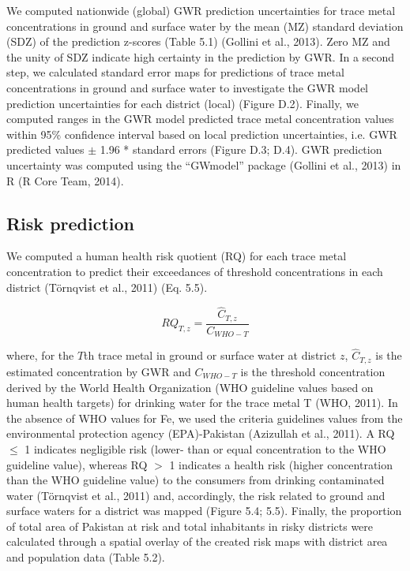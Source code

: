 We computed nationwide (global) GWR prediction uncertainties for trace metal concentrations in ground and surface water by the mean (MZ) standard deviation (SDZ) of the prediction z-scores (Table 5.1) (Gollini et al., 2013).  Zero MZ and the unity of SDZ indicate high certainty in the prediction by GWR. In a second step, we calculated standard error maps for predictions of trace metal concentrations in ground and surface water to investigate the GWR model prediction uncertainties for each district (local) (Figure D.2). Finally, we computed ranges in the GWR model predicted trace metal concentration values within 95\% confidence interval based on local prediction uncertainties, i.e. GWR predicted values $\pm$ 1.96 * standard errors (Figure D.3; D.4). GWR prediction uncertainty was computed using the “GWmodel” package (Gollini et al., 2013) in R (R Core Team, 2014).

\subsection{Risk prediction}
\label{Risk prediction}

We computed a human health risk quotient (RQ) for each trace metal concentration to predict their exceedances of threshold concentrations in each district (Törnqvist et al., 2011) (Eq. 5.5).

\begin{equation}
RQ_{T,z}=\frac{\hat{C}_{T,z}}{C_{WHO-T}}
\end{equation}

where, for the $T$th trace metal in ground or surface water at district $z$, $\hat{C}_{T,z}$ is the estimated concentration by GWR and $C_{WHO-T}$ is the threshold concentration derived by the World Health Organization (WHO guideline values based on human health targets) for drinking water for the trace metal T (WHO, 2011). In the absence of WHO values for Fe, we used the criteria guidelines values from the environmental protection agency (EPA)-Pakistan (Azizullah et al., 2011). A RQ $\leq$ 1 indicates negligible risk (lower- than or equal concentration to the WHO guideline value), whereas RQ $>$ 1 indicates a health risk (higher concentration than the WHO guideline value) to the consumers from drinking contaminated water (Törnqvist et al., 2011) and, accordingly, the risk related to ground and surface waters for a district was mapped (Figure 5.4; 5.5). Finally, the proportion of total area of Pakistan at risk and total inhabitants in risky districts were calculated through a spatial overlay of the created risk maps with district area and population data (Table 5.2).

